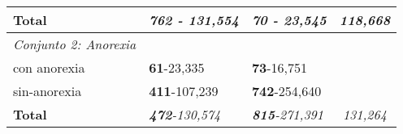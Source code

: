 \begin{table}[!hbt]
{\begin{tabular}{llll}
\rowcolor[HTML]{FFFFFF} 
\textbf{Total}                      & \textit{\textbf{762} - 131,554}                       & \textit{\textbf{70} - 23,545}                         & \multicolumn{1}{c}{\cellcolor[HTML]{FFFFFF}\textit{118,668}}    \\ \hline
\rowcolor[HTML]{EFEFEF} 
\textit{Conjunto 2: Anorexia}       & \multicolumn{1}{c}{\cellcolor[HTML]{EFEFEF}} & \multicolumn{1}{c}{\cellcolor[HTML]{EFEFEF}} &                                                              \\ \hline
\rowcolor[HTML]{FFFFFF} 
con anorexia                        & \textbf{61}-23,335                                    & \textbf{73}-16,751                                    &                                                              \\ \hline
\rowcolor[HTML]{FFFFFF} 
sin-anorexia                        & \textbf{411}-107,239                                  & \textbf{742}-254,640                                  &                                                              \\ \hline
\rowcolor[HTML]{FFFFFF} 
\textbf{Total}                      & \textit{\textbf{472}-130,574}                         & \textit{\textbf{815}-271,391}                         & \multicolumn{1}{c}{\cellcolor[HTML]{FFFFFF}\textit{131,264}} \\ \hline
\end{tabular}

}

\end{table}
